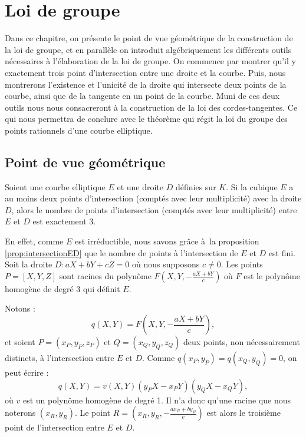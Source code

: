 \chapter{Loi de groupe}
\begin{center}
    Dans ce chapitre, on présente le point de vue géométrique de la construction de la loi de
    groupe, et en parallèle on introduit algébriquement les différents outils nécessaires à
    l'élaboration de la loi de groupe. On commence par montrer qu'il y exactement trois point
    d'intersection entre une droite et la courbe. Puis, nous montrerons l'existence et
    l'unicité de la droite qui intersecte deux points de la courbe, ainsi que de la tangente en
    un point de la courbe. Muni de ces deux outils nous nous consacreront à la construction de
    la loi des cordes-tangentes. Ce qui nous permettra de conclure avec le théorème qui régit
    la loi du groupe des points rationnels d'une courbe elliptique.
\end{center}

\section{Point de vue géométrique}

\begin{proposition}
    \label{prop:secTanGeo}
    
    Soient une courbe elliptique $E$ et une droite $D$ définies sur
    $K$. Si la cubique $E$ a au moins deux points d'intersection (comptés avec leur
    multiplicité) avec la droite $D$, alors le nombre de points d'intersection (comptés avec
    leur multiplicité) entre $E$ et $D$ est exactement $3$.
\end{proposition}

\begin{demonstration}
   En effet, comme $E$ est irréductible, nous savons grâce à la proposition
   \ref{prop:intersectionED}  que le
   nombre de points à l'intersection de $E$ et $D$ est fini. Soit la droite $D : aX + bY + cZ =
   0$ où nous supposons $c \neq 0$. Les points $P = [X,Y,Z]$ sont racines du polynôme $F(X,Y,-
   \frac{aX+bY}{c})$ où $F$ est le polynôme homogène de degré 3 qui définit $E$. 

   Notons :
   \[
   q(X,Y)=F(X,Y,- \frac{aX + bY}{c})
   ,\] 
   et soient $P=(x_{P},y_{P},z_{P})$ et $Q=(x_{Q},y_{Q},z_{Q})$ deux points, non nécessairement
   distincts, à l'intersection
   entre $E$ et $D$. Comme $q(x_{P},y_{P}) = q(x_{Q},y_{Q})=0$, on peut écrire : 
   \[
   q(X,Y)=v(X,Y)(y_{P}X-x_{P}Y)(y_{Q}X-x_{Q}Y)
   ,\] 
   où $v$ est un polynôme homogène de degré 1. Il n'a donc qu'une racine que nous noterons
   $(x_{R},y_{R})$. Le point $R=(x_{R},y_{R},- \frac{ax_{R}+by_{R}}{c})$ est alors le troisième
   point de l'intersection entre $E$ et $D$.
\end{demonstration}

